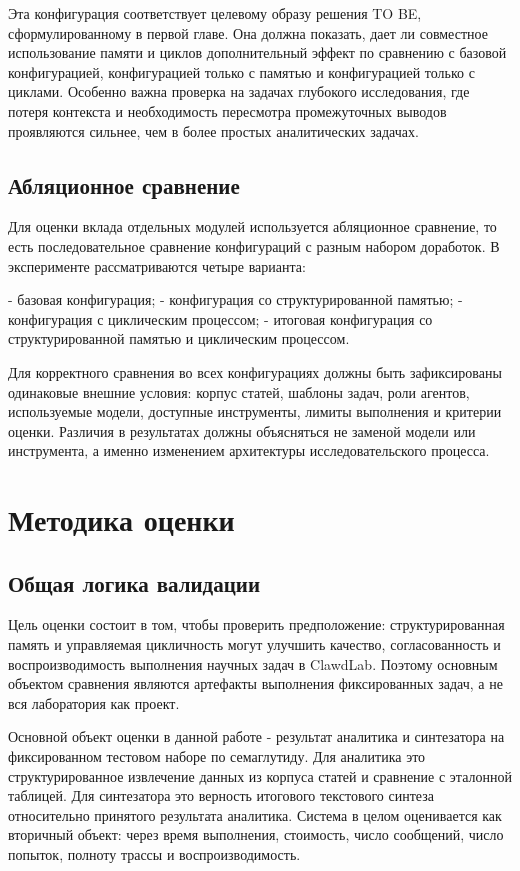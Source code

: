 Эта конфигурация соответствует целевому образу решения TO BE, сформулированному в первой главе. Она должна показать, дает ли совместное использование памяти и циклов дополнительный эффект по сравнению с базовой конфигурацией, конфигурацией только с памятью и конфигурацией только с циклами. Особенно важна проверка на задачах глубокого исследования, где потеря контекста и необходимость пересмотра промежуточных выводов проявляются сильнее, чем в более простых аналитических задачах.

\subsection{Абляционное сравнение}

Для оценки вклада отдельных модулей используется абляционное сравнение, то есть последовательное сравнение конфигураций с разным набором доработок. В эксперименте рассматриваются четыре варианта:

- базовая конфигурация;
- конфигурация со структурированной памятью;
- конфигурация с циклическим процессом;
- итоговая конфигурация со структурированной памятью и циклическим процессом.

Для корректного сравнения во всех конфигурациях должны быть зафиксированы одинаковые внешние условия: корпус статей, шаблоны задач, роли агентов, используемые модели, доступные инструменты, лимиты выполнения и критерии оценки. Различия в результатах должны объясняться не заменой модели или инструмента, а именно изменением архитектуры исследовательского процесса.

\section{Методика оценки}

\subsection{Общая логика валидации}

Цель оценки состоит в том, чтобы проверить предположение: структурированная память и управляемая цикличность могут улучшить качество, согласованность и воспроизводимость выполнения научных задач в ClawdLab. Поэтому основным объектом сравнения являются артефакты выполнения фиксированных задач, а не вся лаборатория как проект.

Основной объект оценки в данной работе - результат аналитика и синтезатора на фиксированном тестовом наборе по семаглутиду. Для аналитика это структурированное извлечение данных из корпуса статей и сравнение с эталонной таблицей. Для синтезатора это верность итогового текстового синтеза относительно принятого результата аналитика. Система в целом оценивается как вторичный объект: через время выполнения, стоимость, число сообщений, число попыток, полноту трассы и воспроизводимость.

